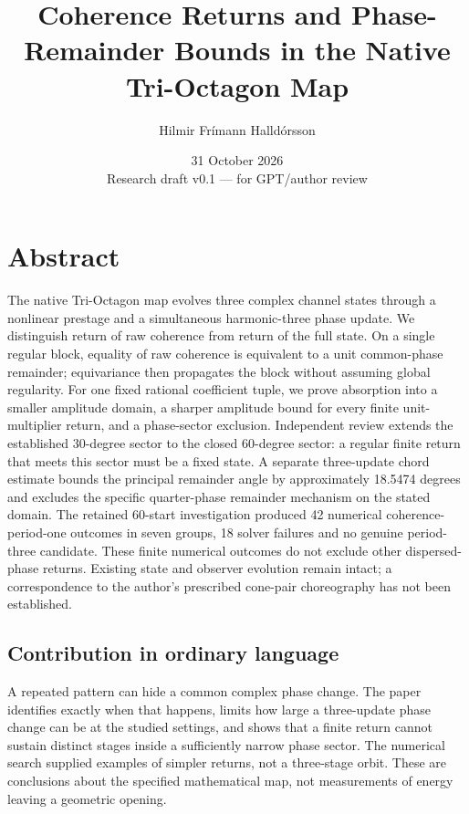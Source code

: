 \documentclass[11pt,a4paper]{article}
\title{Coherence Returns and Phase-Remainder Bounds in the Native Tri-Octagon Map}
\author{Hilmir Frímann Halldórsson}
\date{31 October 2026\\Research draft v0.1 — for GPT/author review}
\begin{document}
\maketitle
\section*{Abstract}
The native Tri-Octagon map evolves three complex channel states through a nonlinear prestage and a simultaneous harmonic-three phase update. We distinguish return of raw coherence from return of the full state. On a single regular block, equality of raw coherence is equivalent to a unit common-phase remainder; equivariance then propagates the block without assuming global regularity. For one fixed rational coefficient tuple, we prove absorption into a smaller amplitude domain, a sharper amplitude bound for every finite unit-multiplier return, and a phase-sector exclusion. Independent review extends the established 30-degree sector to the closed 60-degree sector: a regular finite return that meets this sector must be a fixed state. A separate three-update chord estimate bounds the principal remainder angle by approximately 18.5474 degrees and excludes the specific quarter-phase remainder mechanism on the stated domain. The retained 60-start investigation produced 42 numerical coherence-period-one outcomes in seven groups, 18 solver failures and no genuine period-three candidate. These finite numerical outcomes do not exclude other dispersed-phase returns. Existing state and observer evolution remain intact; a correspondence to the author's prescribed cone-pair choreography has not been established.

\subsection*{Contribution in ordinary language}
A repeated pattern can hide a common complex phase change. The paper identifies exactly when that happens, limits how large a three-update phase change can be at the studied settings, and shows that a finite return cannot sustain distinct stages inside a sufficiently narrow phase sector. The numerical search supplied examples of simpler returns, not a three-stage orbit. These are conclusions about the specified mathematical map, not measurements of energy leaving a geometric opening.
\end{document}
